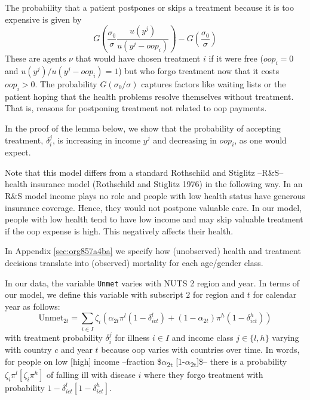 \documentclass[a4paper,12pt]{article}
\makeatletter
\newcommand{\citeprocitem}[2]{\hyper@linkstart{cite}{citeproc_bib_item_#1}#2\hyper@linkend}
\makeatother
\begin{document}
The probability that a patient postpones or skips a treatment because it is too expensive is given by
\begin{equation}
\label{eq:3}
G\left( \frac{\sigma_0}{\sigma} \frac{u(y^{j})}{u(y^{j}-oop_{i})} \right) - G\left( \frac{\sigma_0}{\sigma} \right)
\end{equation}
These are agents \(\nu\) that would have chosen treatment \(i\) if it were free (\(oop_{i}=0\) and \(u(y^j)/u(y^j-oop_i)=1\)) but who forgo treatment now that it costs \(oop_{i}>0\). The probability \(G(\sigma_{0}/\sigma)\) captures factors like waiting lists or the patient hoping that the health problems resolve themselves without treatment. That is, reasons for postponing treatment not related to oop payments.

In the proof of the lemma below, we show that the probability of accepting treatment, \(\delta_i^j\), is increasing in income \(y^j\) and decreasing in \(oop_{i}\), as one would expect.

Note that this model differs from a standard Rothschild and Stiglitz --R\&S-- health insurance model (\citeprocitem{23}{Rothschild and Stiglitz 1976}) in the following way. In an R\&S model income plays no role and people with low health status have generous insurance coverage. Hence, they would not postpone valuable care. In our model, people with low health tend to have low income and may skip valuable treatment if the oop expense is high. This negatively affects their health.

In Appendix \ref{sec:org857a4ba} we specify how (unobserved) health and treatment decisions translate into (observed) mortality for each age/gender class.

In our data, the variable \texttt{Unmet} varies with NUTS 2 region and year. In terms of our model, we define this variable with subscript \(2\) for region and \(t\) for calendar year as follows:
\begin{equation}
\label{eq:Unmet}
\text{Unmet}_{2t} = \sum_{i \in I} \zeta_i (\alpha_{2t} \pi^l (1-\delta^l_{ict}) + (1-\alpha_{2t}) \pi^h (1-\delta^h_{ict}))
\end{equation}
with treatment probability \(\delta^j_i\) for illness \(i \in I\) and income class \(j \in \{l,h\}\) varying with country \(c\) and year \(t\) because oop varies with countries over time. In words, for people on low [high] income --fraction \$\(\alpha\)\textsubscript{2t} [1-\(\alpha\)\textsubscript{2t}]\$-- there is a probability \(\zeta_i \pi^l [\zeta_i \pi^h]\) of falling ill with disease \(i\) where they forgo treatment with probability \(1-\delta_{ict}^l [1-\delta_{ict}^h]\).
\end{document}
